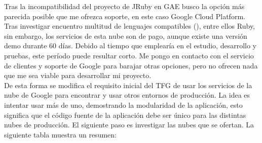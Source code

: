 Tras la incompatibilidad del proyecto de JRuby en GAE busco la opción más parecida posible que me ofrezca soporte, en este caso Google Cloud Platform. Tras investigar encuentro multitud de lenguajes compatibles (\cite{URL:Lenguajes_GoogleCloud}), entre ellos Ruby, sin embargo, los servicios de esta nube son de pago, aunque existe una versión demo durante 60 días. Debido al tiempo que emplearía en el estudio, desarrollo y pruebas, este período puede resultar corto. Me pongo en contacto con el servicio de clientes y soporte de Google para barajar otras opciones, pero no ofrecen nada que me sea viable para desarrollar mi proyecto.\\

De esta forma se modifica el requisito inicial del TFG de usar los servicios de la nube de Google para encontrar y usar otros entornos de producción. La idea es intentar usar más de uno, demostrando la modularidad de la aplicación, esto significa que el código fuente de la aplicación debe ser único para las distintas nubes de producción. El siguiente paso es investigar las nubes que se ofertan. La siguiente tabla muestra un resumen:

